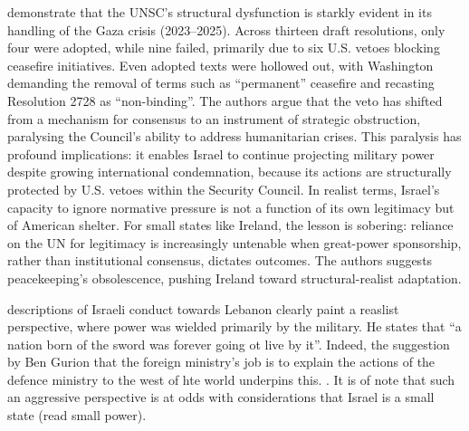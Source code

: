 \textcite{DUMAN_2025} demonstrate that the UNSC’s structural dysfunction is starkly evident in its handling of the Gaza crisis (2023–2025).  Across thirteen draft resolutions, only four were adopted, while nine failed, primarily due to six U.S. vetoes blocking ceasefire initiatives.  Even adopted texts were hollowed out, with Washington demanding the removal of terms such as ``permanent'' ceasefire and recasting Resolution 2728 as ``non-binding''.  The authors argue that the veto has shifted from a mechanism for consensus to an instrument of strategic obstruction, paralysing the Council’s ability to address humanitarian crises.  This paralysis has profound implications: it enables Israel to continue projecting military power despite growing international condemnation, because its actions are structurally protected by U.S. vetoes within the Security Council.  In realist terms, Israel’s capacity to ignore normative pressure is not a function of its own legitimacy but of American shelter.  For small states like Ireland, the lesson is sobering: reliance on the UN for legitimacy is increasingly untenable when great-power sponsorship, rather than institutional consensus, dictates outcomes. \textcite{DUMAN_2025} The authors suggests peacekeeping’s obsolescence, pushing Ireland toward structural-realist adaptation.

                                                                                                                          
\parencite{HIRST_2010} descriptions of Israeli conduct towards Lebanon clearly paint a reaslist perspective, where power was wielded primarily by the military. He states that ``a nation born of the sword was forever going ot live by it''. Indeed, the suggestion by Ben Gurion that the foreign ministry's job is to explain the actions of the defence ministry to the west of hte world underpins this. \parencite[p. 53]{HIRST_2010}. It is of note that such an aggressive perspective is at odds with considerations that Israel is a small state (read small power).

